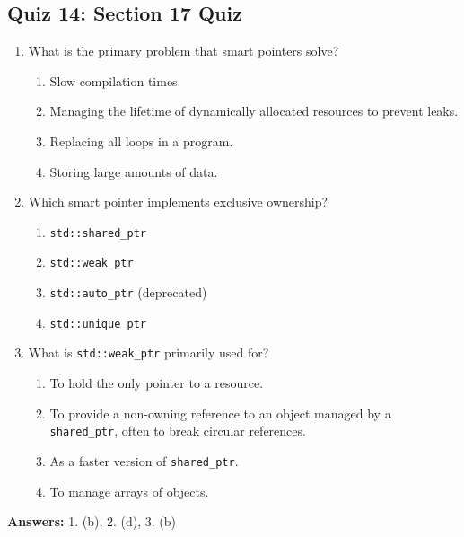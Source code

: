 \subsection{Quiz 14: Section 17 Quiz}
\begin{enumerate}
    \item What is the primary problem that smart pointers solve?
    \begin{enumerate}
        \item[a)] Slow compilation times.
        \item[b)] Managing the lifetime of dynamically allocated resources to prevent leaks.
        \item[c)] Replacing all loops in a program.
        \item[d)] Storing large amounts of data.
    \end{enumerate}

    \item Which smart pointer implements exclusive ownership?
    \begin{enumerate}
        \item[a)] \texttt{std::shared\_ptr}
        \item[b)] \texttt{std::weak\_ptr}
        \item[c)] \texttt{std::auto\_ptr} (deprecated)
        \item[d)] \texttt{std::unique\_ptr}
    \end{enumerate}

    \item What is \texttt{std::weak\_ptr} primarily used for?
    \begin{enumerate}
        \item[a)] To hold the only pointer to a resource.
        \item[b)] To provide a non-owning reference to an object managed by a \texttt{shared\_ptr}, often to break circular references.
        \item[c)] As a faster version of \texttt{shared\_ptr}.
        \item[d)] To manage arrays of objects.
    \end{enumerate}
\end{enumerate}

\textbf{Answers:} 1. (b), 2. (d), 3. (b)
